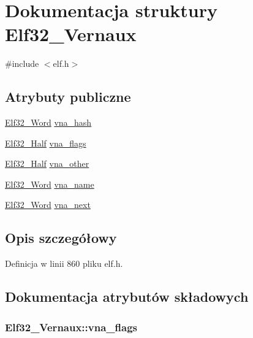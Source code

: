 \hypertarget{struct_elf32___vernaux}{\section{Dokumentacja struktury Elf32\-\_\-\-Vernaux}
\label{struct_elf32___vernaux}
}


{\ttfamily \#include $<$elf.\-h$>$}

\subsection*{Atrybuty publiczne}
\begin{DoxyCompactItemize}
\item 
\hyperlink{elf_8h_af5924ece606c732e86f8263a19408e45}{Elf32\-\_\-\-Word} \hyperlink{struct_elf32___vernaux_aeae097b35e2038c53eabb3fe3e0c7bf1}{vna\-\_\-hash}
\item 
\hyperlink{elf_8h_a2ff0787d7d1bae0f251192806a2974ca}{Elf32\-\_\-\-Half} \hyperlink{struct_elf32___vernaux_a4da8f50d1625f6cf7a0c3415e94958fb}{vna\-\_\-flags}
\item 
\hyperlink{elf_8h_a2ff0787d7d1bae0f251192806a2974ca}{Elf32\-\_\-\-Half} \hyperlink{struct_elf32___vernaux_a28f6da095d6169a589ab3bad837258fc}{vna\-\_\-other}
\item 
\hyperlink{elf_8h_af5924ece606c732e86f8263a19408e45}{Elf32\-\_\-\-Word} \hyperlink{struct_elf32___vernaux_a8bf6007fe319d74753d03d0fa7977002}{vna\-\_\-name}
\item 
\hyperlink{elf_8h_af5924ece606c732e86f8263a19408e45}{Elf32\-\_\-\-Word} \hyperlink{struct_elf32___vernaux_acff2104085a8a54ccbb16b0f00be5375}{vna\-\_\-next}
\end{DoxyCompactItemize}


\subsection{Opis szczegółowy}


Definicja w linii 860 pliku elf.\-h.



\subsection{Dokumentacja atrybutów składowych}
\hypertarget{struct_elf32___vernaux_a4da8f50d1625f6cf7a0c3415e94958fb}{
\subsubsection[{vna\-\_\-flags}]{ Elf32\-\_\-\-Vernaux\-::vna\-\_\-flags}}\label{struct_elf32___vernaux_a4da8f50d1625f6cf7a0c3415e94958fb}


